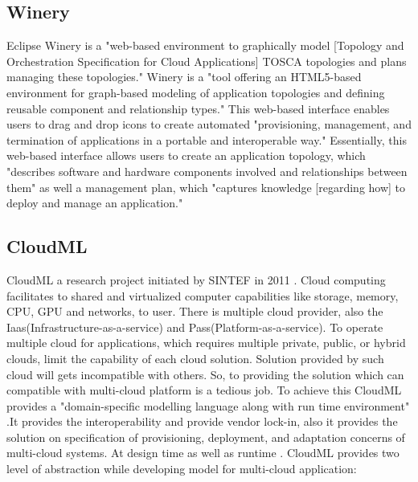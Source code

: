 \subsection{ Winery}

     Eclipse Winery \cite{www-winery} is a "web-based environment to 
     graphically model [Topology and Orchestration Specification for 
     Cloud Applications] TOSCA topologies and plans managing these 
     topologies." Winery \cite{winery-paper-2013} is a "tool 
     offering an HTML5-based environment for graph-based modeling of 
     application topologies and defining reusable component and 
     relationship types." This web-based \cite{winery-paper-2013} 
     interface enables users to drag and drop icons to create 
     automated "provisioning, management, and termination of 
     applications in a portable and interoperable way." 
     Essentially, this web-based interface \cite{winery-paper-2013} 
     allows users to create an application topology, which 
     "describes software and hardware components involved and 
     relationships between them" as well a management plan, which 
     "captures knowledge [regarding how] to deploy and manage an 
     application."

\subsection{ CloudML}
                                                            
     CloudML a research project initiated by SINTEF in 2011
     \cite{www-cloudml}. Cloud computing facilitates to shared
     and virtualized computer capabilities like storage, memory,
     CPU, GPU and networks, to user. There is multiple cloud provider,
     also the Iaas(Infrastructure-as-a-service) and
     Pass(Platform-as-a-service). To operate multiple cloud for
     applications, which requires multiple private, public, or hybrid
     clouds, limit the capability of each cloud solution.  Solution
     provided by such cloud will gets incompatible with others. So,
     to providing the solution which can compatible with multi-cloud
     platform is a tedious job. To achieve this CloudML provides a
     "domain-specific modelling language along with run time environment"
     \cite{www-cloudml}.It provides the interoperability and provide
     vendor lock-in, also it provides the solution on specification of
     provisioning, deployment, and adaptation concerns of multi-cloud
     systems. At design time as well as runtime \cite{www-cloudml}.
     CloudML provides two level of abstraction while developing model
     for multi-cloud application:

